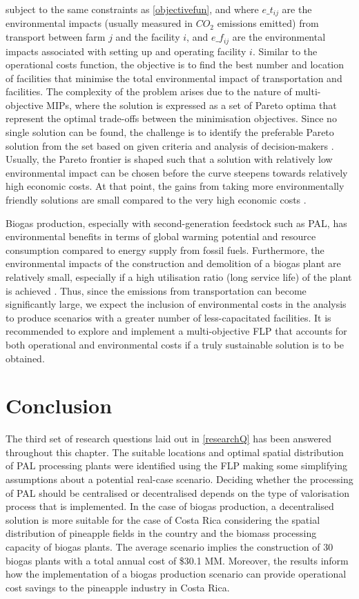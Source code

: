 subject to the same constraints as \cref{objectivefun}, and where $e\_t_{ij}$ are the environmental impacts (usually measured in $CO_2$ emissions emitted) from transport between farm $j$ and the facility $i$, and $e\_f_{ij}$ are the environmental impacts associated with setting up and operating facility $i$. Similar to the operational costs function, the objective is to find the best number and location of facilities that minimise the total environmental impact of transportation and facilities. The complexity of the problem arises due to the nature of multi-objective MIPs, where the solution is expressed as a set of Pareto optima that represent the optimal trade-offs between the minimisation objectives. Since no single solution can be found, the challenge is to identify the preferable Pareto solution from the set based on given criteria and analysis of decision-makers \cite{limleamthong2018combined}. Usually, the Pareto frontier is shaped such that a solution with relatively low environmental impact can be chosen before the curve steepens towards relatively high economic costs. At that point, the gains from taking more environmentally friendly solutions are small compared to the very high economic costs \cite{harris2009multi}.

Biogas production, especially with second-generation feedstock such as PAL, has environmental benefits in terms of global warming potential and resource consumption compared to energy supply from fossil fuels. Furthermore, the environmental impacts of the construction and demolition of a biogas plant are relatively small, especially if a high utilisation ratio (long service life) of the plant is achieved \cite{hijazi2016review}. Thus, since the emissions from transportation can become significantly large, we expect the inclusion of environmental costs in the analysis to produce scenarios with a greater number of less-capacitated facilities. It is recommended to explore and implement a multi-objective FLP that accounts for both operational and environmental costs if a truly sustainable solution is to be obtained. 

\section{Conclusion}

The third set of research questions laid out in \cref{researchQ} has been answered throughout this chapter. The suitable locations and optimal spatial distribution of PAL processing plants were identified using the FLP making some simplifying assumptions about a potential real-case scenario. Deciding whether the processing of PAL should be centralised or decentralised depends on the type of valorisation process that is implemented. In the case of biogas production, a decentralised solution is more suitable for the case of Costa Rica considering the spatial distribution of pineapple fields in the country and the biomass processing capacity of biogas plants. The average scenario implies the construction of 30 biogas plants with a total annual cost of \$30.1 MM. Moreover, the results inform how the implementation of a biogas production scenario can provide operational cost savings to the pineapple industry in Costa Rica. 

